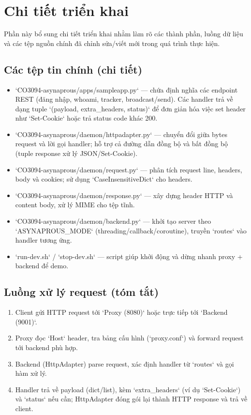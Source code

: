 \documentclass[a4paper,12pt]{article}
\begin{document}
\newpage
\section{Chi tiết triển khai}
Phần này bổ sung chi tiết triển khai nhằm làm rõ các thành phần, luồng dữ liệu và các tệp nguồn chính đã chỉnh sửa/viết mới trong quá trình thực hiện.

\subsection{Các tệp tin chính (chi tiết)}
\begin{itemize}
  \item `CO3094-asynaprous/apps/sampleapp.py` — chứa định nghĩa các endpoint REST (đăng nhập, whoami, tracker, broadcast/send). Các handler trả về dạng tuple `(payload, extra\_headers, status)` để đơn giản hóa việc set header như `Set-Cookie` hoặc trả status code khác 200.
  \item `CO3094-asynaprous/daemon/httpadapter.py` — chuyển đổi giữa bytes request và lời gọi handler; hỗ trợ cả đường dẫn đồng bộ và bất đồng bộ (tuple response xử lý JSON/Set-Cookie).
  \item `CO3094-asynaprous/daemon/request.py` — phân tích request line, headers, body và cookies; sử dụng `CaseInsensitiveDict` cho headers.
  \item `CO3094-asynaprous/daemon/response.py` — xây dựng header HTTP và content body, xử lý MIME cho tệp tĩnh.
  \item `CO3094-asynaprous/daemon/backend.py` — khởi tạo server theo `ASYNAPROUS_MODE` (threading/callback/coroutine), truyền `routes` vào handler tương ứng.
  \item `run-dev.sh` / `stop-dev.sh` — script giúp khởi động và dừng nhanh proxy + backend để demo.
\end{itemize}

\subsection{Luồng xử lý request (tóm tắt)}
\begin{enumerate}
  \item Client gửi HTTP request tới `Proxy (8080)` hoặc trực tiếp tới `Backend (9001)`.
  \item Proxy đọc `Host` header, tra bảng cấu hình (`proxy.conf`) và forward request tới backend phù hợp.
  \item Backend (HttpAdapter) parse request, xác định handler từ `routes` và gọi hàm xử lý.
  \item Handler trả về payload (dict/list), kèm `extra_headers` (ví dụ `Set-Cookie`) và `status` nếu cần; HttpAdapter đóng gói lại thành HTTP response và trả về client.
\end{enumerate}
\end{document}
